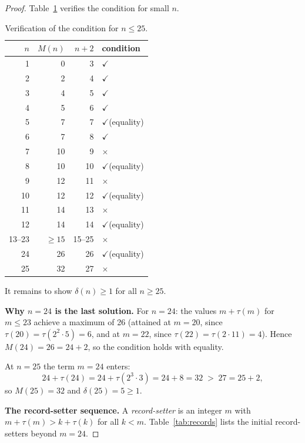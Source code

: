\documentclass[11pt]{article}
\begin{document}
\begin{proof}
Table~\ref{tab:small} verifies the condition for small $n$.

\begin{table}[h]
\centering
\begin{tabular}{rrrl}
\toprule
$n$ & $M(n)$ & $n+2$ & condition\\
\midrule
1  & 0  & 3  & $\checkmark$\\
2  & 2  & 4  & $\checkmark$\\
3  & 4  & 5  & $\checkmark$\\
4  & 5  & 6  & $\checkmark$\\
5  & 7  & 7  & $\checkmark$\;(equality)\\
6  & 7  & 8  & $\checkmark$\\
7  & 10 & 9  & $\times$\\
8  & 10 & 10 & $\checkmark$\;(equality)\\
9  & 12 & 11 & $\times$\\
10 & 12 & 12 & $\checkmark$\;(equality)\\
11 & 14 & 13 & $\times$\\
12 & 14 & 14 & $\checkmark$\;(equality)\\
13--23 & $\geq 15$ & 15--25 & $\times$\\
24 & 26 & 26 & $\checkmark$\;(equality)\\
25 & 32 & 27 & $\times$\\
\bottomrule
\end{tabular}
\caption{Verification of the condition for $n \leq 25$.}
\label{tab:small}
\end{table}

It remains to show $\delta(n) \geq 1$ for all $n \geq 25$.

\medskip\noindent\textbf{Why $n = 24$ is the last solution.}
For $n = 24$: the values $m + \tau(m)$ for $m \leq 23$ achieve a maximum of 26
(attained at $m = 20$, since $\tau(20) = \tau(2^2\cdot 5) = 6$, and at $m = 22$,
since $\tau(22) = \tau(2 \cdot 11) = 4$).  Hence $M(24) = 26 = 24 + 2$, so the
condition holds with equality.

At $n = 25$ the term $m = 24$ enters:
\[
  24 + \tau(24) = 24 + \tau(2^3 \cdot 3) = 24 + 8 = 32 \;>\; 27 = 25 + 2,
\]
so $M(25) = 32$ and $\delta(25) = 5 \geq 1$.

\medskip\noindent\textbf{The record-setter sequence.}
A \emph{record-setter} is an integer $m$ with
$m + \tau(m) > k + \tau(k)$ for all $k < m$.
Table~\ref{tab:records} lists the initial record-setters beyond $m = 24$.


\end{proof}
\end{document}
